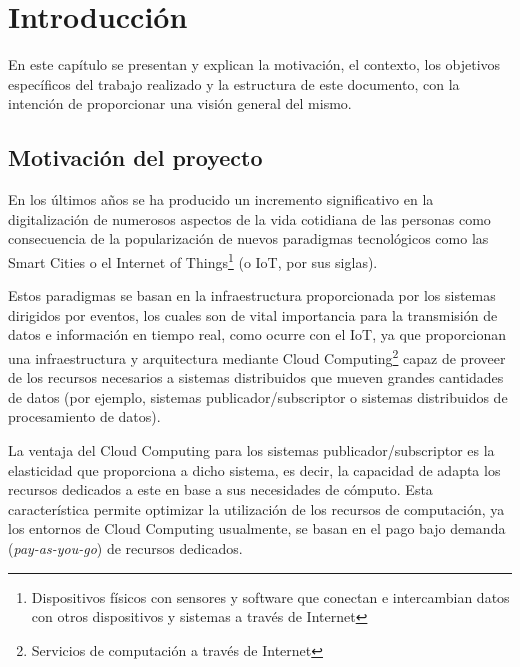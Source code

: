 \chapter{Introducción} \label{chp:intro}

En este capítulo se presentan y explican la motivación, el contexto, los objetivos
específicos del trabajo realizado y la estructura de este documento, con la 
intención de proporcionar una visión general del mismo.


\section{Motivación del proyecto} \label{sct:intro_motivacion}


En los últimos años se ha producido un incremento significativo en la 
digitalización de numerosos aspectos de la vida cotidiana de las personas como 
consecuencia de la popularización de nuevos paradigmas tecnológicos como las 
Smart Cities o el Internet of Things\footnote{Dispositivos físicos con sensores y 
software que conectan e intercambian datos con otros dispositivos y sistemas a 
través de Internet} (o IoT, por sus siglas).

Estos paradigmas se basan en la infraestructura proporcionada por los sistemas 
dirigidos por eventos, los cuales son de vital importancia para la transmisión
de datos e información en tiempo real, como ocurre con el IoT, ya que 
proporcionan una infraestructura y arquitectura mediante 
Cloud Computing\footnote{Servicios de computación a través de Internet} 
capaz de proveer de los recursos necesarios a sistemas distribuidos que mueven 
grandes cantidades de datos (por ejemplo, sistemas publicador/subscriptor o 
sistemas distribuidos de procesamiento de datos).

La ventaja del Cloud Computing para los sistemas publicador/subscriptor 
es la elasticidad que proporciona a dicho sistema, es decir, la capacidad de 
adapta los recursos  dedicados a este en base a sus necesidades de cómputo. Esta 
característica permite optimizar la utilización de los recursos de computación,
ya los entornos de Cloud Computing usualmente, se basan en el pago bajo 
demanda (\textit{pay-as-you-go}) de recursos dedicados.

